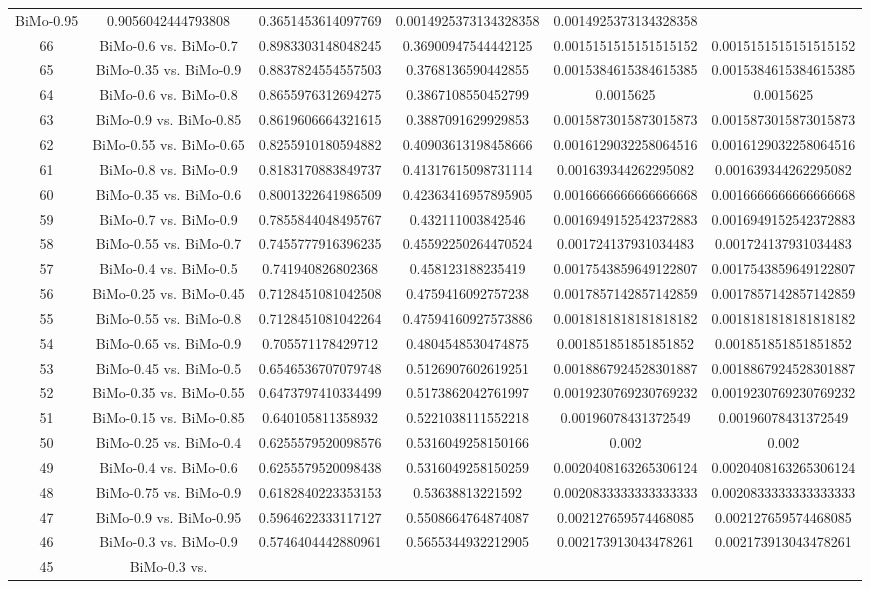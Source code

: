 \documentclass[a4paper,10pt]{article}
\begin{document}
\begin{landscape}
\begin{table}[!htp]
\begin{tabular}{cccccc}
BiMo-0.95&0.9056042444793808&0.3651453614097769&0.0014925373134328358&0.0014925373134328358\\66&BiMo-0.6 vs. BiMo-0.7&0.8983303148048245&0.36900947544442125&0.0015151515151515152&0.0015151515151515152\\65&BiMo-0.35 vs. BiMo-0.9&0.8837824554557503&0.3768136590442855&0.0015384615384615385&0.0015384615384615385\\64&BiMo-0.6 vs. BiMo-0.8&0.8655976312694275&0.3867108550452799&0.0015625&0.0015625\\63&BiMo-0.9 vs. BiMo-0.85&0.8619606664321615&0.3887091629929853&0.0015873015873015873&0.0015873015873015873\\62&BiMo-0.55 vs. BiMo-0.65&0.8255910180594882&0.40903613198458666&0.0016129032258064516&0.0016129032258064516\\61&BiMo-0.8 vs. BiMo-0.9&0.8183170883849737&0.41317615098731114&0.001639344262295082&0.001639344262295082\\60&BiMo-0.35 vs. BiMo-0.6&0.8001322641986509&0.42363416957895905&0.0016666666666666668&0.0016666666666666668\\59&BiMo-0.7 vs. BiMo-0.9&0.7855844048495767&0.432111003842546&0.0016949152542372883&0.0016949152542372883\\58&BiMo-0.55 vs. BiMo-0.7&0.7455777916396235&0.45592250264470524&0.001724137931034483&0.001724137931034483\\57&BiMo-0.4 vs. BiMo-0.5&0.741940826802368&0.458123188235419&0.0017543859649122807&0.0017543859649122807\\56&BiMo-0.25 vs. BiMo-0.45&0.7128451081042508&0.4759416092757238&0.0017857142857142859&0.0017857142857142859\\55&BiMo-0.55 vs. BiMo-0.8&0.7128451081042264&0.47594160927573886&0.0018181818181818182&0.0018181818181818182\\54&BiMo-0.65 vs. BiMo-0.9&0.705571178429712&0.4804548530474875&0.001851851851851852&0.001851851851851852\\53&BiMo-0.45 vs. BiMo-0.5&0.6546536707079748&0.5126907602619251&0.0018867924528301887&0.0018867924528301887\\52&BiMo-0.35 vs. BiMo-0.55&0.6473797410334499&0.5173862042761997&0.0019230769230769232&0.0019230769230769232\\51&BiMo-0.15 vs. BiMo-0.85&0.640105811358932&0.5221038111552218&0.00196078431372549&0.00196078431372549\\50&BiMo-0.25 vs. BiMo-0.4&0.6255579520098576&0.5316049258150166&0.002&0.002\\49&BiMo-0.4 vs. BiMo-0.6&0.6255579520098438&0.5316049258150259&0.0020408163265306124&0.0020408163265306124\\48&BiMo-0.75 vs. BiMo-0.9&0.6182840223353153&0.53638813221592&0.0020833333333333333&0.0020833333333333333\\47&BiMo-0.9 vs. BiMo-0.95&0.5964622333117127&0.5508664764874087&0.002127659574468085&0.002127659574468085\\46&BiMo-0.3 vs. BiMo-0.9&0.5746404442880961&0.5655344932212905&0.002173913043478261&0.002173913043478261\\45&BiMo-0.3 vs. 
\end{tabular}
\end{table}
\end{landscape}
\end{document}
